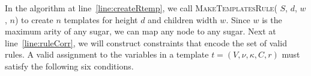 In the algorithm at line~\ref{line:createRtemp}, we call \textsc{MakeTemplatesRule}( $S$, $d$, $w$, $n$) to create $n$ templates for
height $d$ and children width $w$.
Since $w$ is the maximum arity of any sugar, we can map any node to any sugar.
Next at line~\ref{line:ruleCorr}, we will construct constraints
that encode the set of valid rules. 
A valid assignment to the variables in
a template  $t = (V, \nu, \kappa, C, r)$ must
satisfy the following six conditions.

